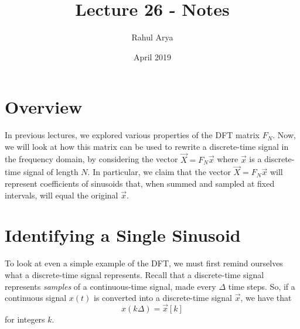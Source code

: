 \documentclass[letterpaper]{article}
\title{Lecture 26 - Notes}
\author{Rahul Arya}
\date{April 2019}
\theoremstyle{remark}
\begin{document}
\maketitle

\section{Overview}
In previous lectures, we explored various properties of the DFT matrix $F_N$. Now, we will look at how this matrix can be used to rewrite a discrete-time signal in the frequency domain, by considering the vector $\vec{X} = F_N\vec{x}$ where $\vec{x}$ is a discrete-time signal of length $N$. In particular, we claim that the vector $\vec{X} = F_N\vec{x}$ will represent coefficients of sinusoids that, when summed and sampled at fixed intervals, will equal the original $\vec{x}$.

\section{Identifying a Single Sinusoid}
To look at even a simple example of the DFT, we must first remind ourselves what a discrete-time signal represents. Recall that a discrete-time signal represents \emph{samples} of a continuous-time signal, made every $\Delta$ time steps. So, if a continuous signal $x(t)$ is converted into a discrete-time signal $\vec{x}$, we have that
\[
    x(k\Delta) = \vec{x}[k]
\]
for integers $k$.
\end{document}
